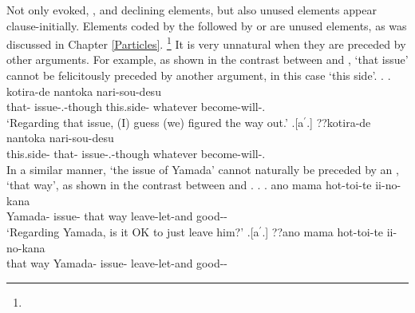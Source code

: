 Not only evoked, , and declining elements,
but also unused elements appear clause-initially.
Elements coded by the  followed by  or  are unused elements, as was discussed in Chapter \ref{Particles}.%
 \footnote{
 }
It is very unnatural when they are preceded by other arguments.
For example,
as shown in the contrast between \Next[a] and \Next[b],
 `that issue' cannot be felicitously preceded by another argument, in this case  `this side'.
%
\ex.
 \ag.   kotira-de nantoka nari-sou-desu \\
      that- issue-.-though this.side- whatever become-will-. \\
      `Regarding that issue, (I) guess (we) figured the way out.'
      \hfill{\cite[modified from][283]{niwa06}}
 \bg.[a$^{\prime}$.] ??kotira-de   nantoka nari-sou-desu \\
      this.side- that- issue-.-though whatever become-will-. \\

In a similar manner,
 `the issue of Yamada' cannot naturally be preceded by an ,  `that way',
as shown in the contrast between \Next[a] and \Next[b].
%
\ex.
 \ag.   ano mama hot-toi-te ii-no-kana \\
      Yamada- issue- that way leave-let-and good-- \\
      `Regarding Yamada, is it OK to just leave him?'
      \hfill{\cite[283]{niwa06}}
 \bg.[a$^{\prime}$.] ??ano mama   hot-toi-te ii-no-kana \\
      that way Yamada- issue- leave-let-and good-- \\


